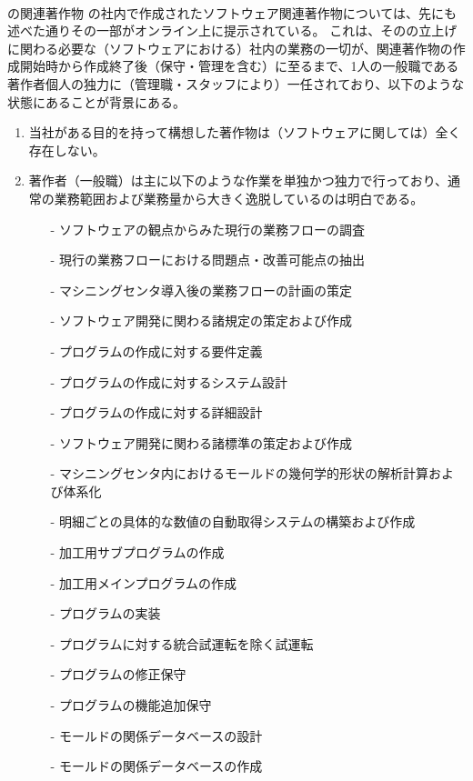 \clearpage
~\vfill
\begin{Column}{\DMname の関連著作物}
\DMname の社内で作成されたソフトウェア関連著作物については、先にも述べた通りその一部がオンライン上に提示されている。
これは、その\DMname の立上げに関わる必要な（ソフトウェアにおける）社内の業務の一切が、関連著作物の作成開始時から作成終了後（保守・管理を含む）に至るまで、1人の一般職である著作者個人の独力に（管理職・スタッフにより）一任されており、以下のような状態にあることが背景にある。
\tcbline*
\begin{enumerate}[label=\Roman*]
\item 当社がある目的を持って構想した著作物は（ソフトウェアに関しては）全く存在しない。
\item
著作者（一般職）は主に以下のような作業を単独かつ独力で行っており、通常の業務範囲および業務量から大きく逸脱しているのは明白である。
  \begin{enumerate}
  \item[-] ソフトウェアの観点からみた現行の業務フローの調査
  \item[-] 現行の業務フローにおける問題点・改善可能点の抽出
  \item[-] マシニングセンタ導入後の業務フローの計画の策定
  \item[-] ソフトウェア開発に関わる諸規定の策定および作成
  \item[-] プログラムの作成に対する要件定義
  \item[-] プログラムの作成に対するシステム設計
  \item[-] プログラムの作成に対する詳細設計
  \item[-] ソフトウェア開発に関わる諸標準の策定および作成
  \item[-] マシニングセンタ内におけるモールドの幾何学的形状の解析計算および体系化
  \item[-] 明細ごとの具体的な数値の自動取得システムの構築および作成
  \item[-] 加工用サブプログラムの作成
  \item[-] 加工用メインプログラムの作成
  \item[-] プログラムの実装
  \item[-] プログラムに対する統合試運転を除く試運転
  \item[-] プログラムの修正保守
  \item[-] プログラムの機能追加保守
  \item[-] モールドの関係データベースの設計
  \item[-] モールドの関係データベースの作成

\end{enumerate}
\end{enumerate}
\end{Column}
